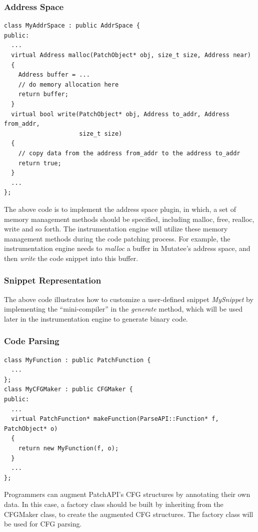 \subsubsection{Address Space}
\begin{lstlisting}[caption=Example of implementing address space plugin]
class MyAddrSpace : public AddrSpace {
public:
  ...
  virtual Address malloc(PatchObject* obj, size_t size, Address near)
  {
    Address buffer = ...
    // do memory allocation here
    return buffer;
  }
  virtual bool write(PatchObject* obj, Address to_addr, Address from_addr,
                     size_t size)
  {
    // copy data from the address from_addr to the address to_addr
    return true;
  }
  ...
};
\end{lstlisting}
The above code is to implement the address space plugin, in which, a set of
memory management methods should be specified, including malloc, free, realloc,
write and so forth. The instrumentation engine will utilize these memory
management methods during the code patching process. For example, the
instrumentation engine needs to \emph{malloc} a buffer in Mutatee's address
space, and then \emph{write} the code snippet into this buffer.

\subsubsection{Snippet Representation}
\label{sec:example-snippet-representation}


The above code illustrates how to customize a user-defined snippet
\emph{MySnippet} by implementing the ``mini-compiler'' in the {\em generate}
method, which will be used later in the instrumentation engine to generate
binary code.

\subsubsection{Code Parsing}
\begin{lstlisting}[caption=Example of customizing CFG parsing]
class MyFunction : public PatchFunction {
  ...
};
class MyCFGMaker : public CFGMaker {
public:
  ...
  virtual PatchFunction* makeFunction(ParseAPI::Function* f, PatchObject* o)
  {
    return new MyFunction(f, o);
  }
  ...
};
\end{lstlisting}
Programmers can augment PatchAPI's CFG structures by annotating their own data.
In this case, a factory class should be built by inheriting from the
CFGMaker class, to create the augmented CFG structures. The factory class will
be used for CFG parsing.

